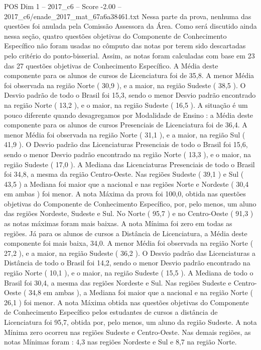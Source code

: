 \begin{textsample}{POS Dim 1 – 2017\_c6 – Score -2.00 – 2017\_c6/enade\_2017\_mat\_67a6a38461.txt}
Nessa parte da prova, nenhuma das questões foi anulada pela Comissão Assessora da Área.
Como será discutido ainda nessa seção, quatro questões objetivas do Componente de Conhecimento Específico não foram usadas no cômputo das notas por terem sido descartadas pelo critério do ponto-bisserial.
Assim, as notas foram calculadas com base em 23 das 27 questões objetivas de Conhecimento Específico.
A Média deste componente para os alunos de cursos de Licenciatura foi de 35,8.
A menor Média foi observada na região Norte ( 30,9 ), e a maior, na região Sudeste ( 38,5 ).
O Desvio padrão de todo o Brasil foi 15,3, sendo o menor Desvio padrão encontrado na região Norte ( 13,2 ), e o maior, na região Sudeste ( 16,5 ).
A situação é um pouco diferente quando desagregamos por Modalidade de Ensino : a Média deste componente para os alunos de cursos Presenciais de Licenciatura foi de 36,4.
A menor Média foi observada na região Norte ( 31,1 ), e a maior, na região Sul ( 41,9 ).
O Desvio padrão das Licenciaturas Presenciais de todo o Brasil foi 15,6, sendo o menor Desvio padrão encontrado na região Norte ( 13,3 ), e o maior, na região Sudeste ( 17,0 ).
A Mediana das Licenciaturas Presenciais de todo o Brasil foi 34,8, a mesma da região Centro-Oeste.
Nas regiões Sudeste ( 39,1 ) e Sul ( 43,5 ) a Mediana foi maior que a nacional e nas regiões Norte e Nordeste ( 30,4 em ambas ) foi menor.
A nota Máxima da prova foi 100,0, obtida nas questões objetivas do Componente de Conhecimento Específico, por, pelo menos, um aluno das regiões Nordeste, Sudeste e Sul.
No Norte ( 95,7 ) e no Centro-Oeste ( 91,3 ) as notas máximas foram mais baixas.
A nota Mínima foi zero em todas as regiões.
Já para os alunos de cursos a Distância de Licenciatura, a Média deste componente foi mais baixa, 34,0.
A menor Média foi observada na região Norte ( 27,2 ), e a maior, na região Sudeste ( 36,2 ).
O Desvio padrão das Licenciaturas a Distância de todo o Brasil foi 14,2, sendo o menor Desvio padrão encontrado na região Norte ( 10,1 ), e o maior, na região Sudeste ( 15,5 ).
A Mediana de todo o Brasil foi 30,4, a mesma das regiões Nordeste e Sul.
Nas regiões Sudeste e Centro-Oeste ( 34,8 em ambas ), a Mediana foi maior que a nacional e na região Norte ( 26,1 ) foi menor.
A nota Máxima obtida nas questões objetivas do Componente de Conhecimento Específico pelos estudantes de cursos a distância de Licenciatura foi 95,7, obtida por, pelo menos, um aluno da região Sudeste.
A nota Mínima zero ocorreu nas regiões Sudeste e Centro-Oeste.
Nas demais regiões, as notas Mínimas foram : 4,3 nas regiões Nordeste e Sul e 8,7 na região Norte.

\end{textsample}
